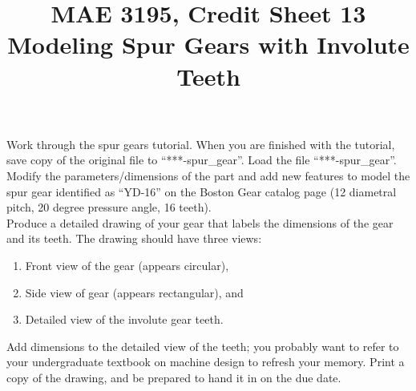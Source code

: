 \documentclass[12pt]{article}
\title{MAE 3195, Credit Sheet 13\\ Modeling Spur Gears with Involute Teeth}
\date{}
\begin{document}
\maketitle

Work through the spur gears tutorial. When you are finished with the tutorial, save copy of the original file to ``***-spur\_gear''. Load the file ``***-spur\_gear''. Modify the parameters/dimensions of the part and add new features to model the spur gear identified as ``YD-16'' on the Boston Gear catalog page (12 diametral pitch, 20 degree pressure angle, 16 teeth).\\

Produce a detailed drawing of your gear that labels the dimensions of the gear and its teeth. The drawing should have three views: 
\begin{enumerate}
	\item Front view of the gear (appears circular),
	\item Side view of gear (appears rectangular), and
	\item Detailed view of the involute gear teeth.
\end{enumerate}
	
Add dimensions to the detailed view of the teeth; you probably want to refer to your undergraduate textbook on machine design to refresh your memory. Print a copy of the drawing, and be prepared to hand it in on the due date.
\end{document}
